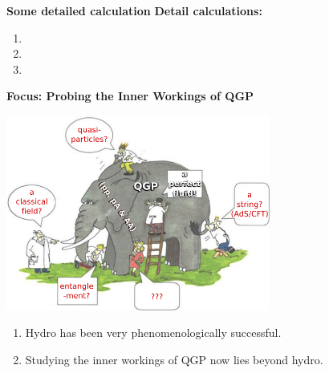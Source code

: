 \documentclass[9pt,a4paper,unknownkeysallowed,xcolor=dvipsnames,aspectratio=43]{beamer}
\begin{document}
%
%
\begin{frame}{\bf\huge Some detailed calculation}	\vspace{2mm}
{\large\bf Detail calculations:}
\vspace{2mm}
\begin{enumerate}
    \item 
    \item
    \item
\end{enumerate}
\end{frame}
%
%
\begin{frame}{\bf\huge Focus: Probing the Inner Workings of QGP}	\vspace{4mm}
\setcounter{page}{1}
\begin{center}
\includegraphics[width=0.65\textwidth]{fig/beyondhydro}
\vspace{4mm}
\begin{enumerate}
\item {Hydro has been very phenomenologically successful.}
\vspace{4mm}
\item {\color{darkred} Studying the inner workings of QGP now lies beyond hydro.}
\end{enumerate}
\end{center}
\end{frame}
\end{document}
